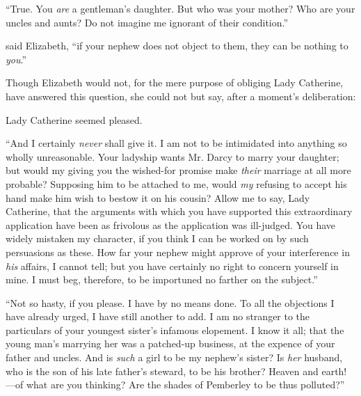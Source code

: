 “True. You {\em are} a gentleman's daughter. But who was your mother? Who are your uncles and aunts? Do not imagine me ignorant of their condition.”

 said Elizabeth, “if your nephew does not object to them, they can be nothing to {\em you}.”


Though Elizabeth would not, for the mere purpose of obliging Lady Catherine, have answered this question, she could not but say, after a moment's deliberation:


Lady Catherine seemed pleased.




“And I certainly {\em never} shall give it. I am not to be intimidated into anything so wholly unreasonable. Your ladyship wants Mr. Darcy to marry your daughter; but would my giving you the wished-for promise make {\em their} marriage at all more probable? Supposing him to be attached to me, would {\em my} refusing to accept his hand make him wish to bestow it on his cousin? Allow me to say, Lady Catherine, that the arguments with which you have supported this extraordinary application have been as frivolous as the application was ill-judged. You have widely mistaken my character, if you think I can be worked on by such persuasions as these. How far your nephew might approve of your interference in {\em his} affairs, I cannot tell; but you have certainly no right to concern yourself in mine. I must beg, therefore, to be importuned no farther on the subject.”

“Not so hasty, if you please. I have by no means done. To all the objections I have already urged, I have still another to add. I am no stranger to the particulars of your youngest sister's infamous elopement. I know it all; that the young man's marrying her was a patched-up business, at the expence of your father and uncles. And is {\em such} a girl to be my nephew's sister? Is {\em her} husband, who is the son of his late father's steward, to be his brother? Heaven and earth!---of what are you thinking? Are the shades of Pemberley to be thus polluted?”

